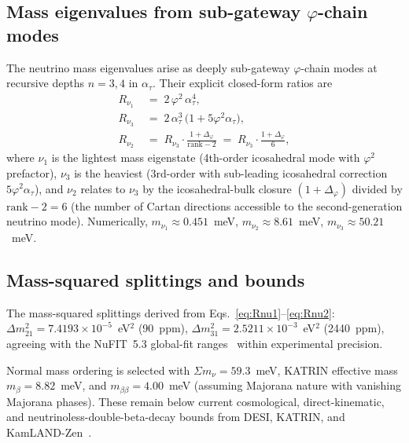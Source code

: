 ﻿\documentclass[reprint,amsmath,amssymb,aps,prd,longbibliography,floatfix]{revtex4-2}
\begin{document}
\subsection{Mass eigenvalues from sub-gateway $\varphi$-chain modes}

The neutrino mass eigenvalues arise as deeply sub-gateway
$\varphi$-chain modes at recursive depths $n = 3, 4$ in $\alpha_\tau$.
Their explicit closed-form ratios are
\begin{align}
R_{\nu_1} \;&=\; 2 \, \varphi^2 \, \alpha_\tau^4,
   \label{eq:Rnu1} \\
R_{\nu_3} \;&=\; 2 \, \alpha_\tau^3 \, \bigl(1 + 5 \varphi^2 \alpha_\tau\bigr),
   \label{eq:Rnu3} \\
R_{\nu_2} \;&=\; R_{\nu_3} \cdot \frac{1 + \Delta_\varphi}{\text{rank} - 2}
            \;=\; R_{\nu_3} \cdot \frac{1 + \Delta_\varphi}{6},
   \label{eq:Rnu2}
\end{align}
where $\nu_1$ is the lightest mass eigenstate (4th-order icosahedral
mode with $\varphi^2$ prefactor), $\nu_3$ is the heaviest (3rd-order
with sub-leading icosahedral correction $5\varphi^2\alpha_\tau$),
and $\nu_2$ relates to $\nu_3$ by the icosahedral-bulk closure
$(1+\Delta_\varphi)$ divided by $\text{rank} - 2 = 6$ (the number of
Cartan directions accessible to the second-generation neutrino mode).
Numerically, $m_{\nu_1} \approx 0.451$~meV, $m_{\nu_2} \approx 8.61$~meV,
$m_{\nu_3} \approx 50.21$~meV.

\subsection{Mass-squared splittings and bounds}

The mass-squared splittings derived from
Eqs.~\eqref{eq:Rnu1}--\eqref{eq:Rnu2}:
$\Delta m^2_{21} = 7.4193 \times 10^{-5}$~eV$^2$ (\SI{90}{ppm}),
$\Delta m^2_{31} = 2.5211 \times 10^{-3}$~eV$^2$ (\SI{2440}{ppm}),
agreeing with the NuFIT~5.3 global-fit ranges~\cite{Esteban2020,NuFIT53}
within experimental precision.

Normal mass ordering is selected with $\Sigma m_\nu = 59.3$~meV,
KATRIN effective mass $m_\beta = 8.82$~meV, and
$m_{\beta\beta} = 4.00$~meV (assuming Majorana nature with vanishing
Majorana phases). These remain below current cosmological,
direct-kinematic, and neutrinoless-double-beta-decay bounds from
DESI, KATRIN, and KamLAND-Zen~\cite{DESI2024,KATRIN2024,KamLANDZen2024}.
\end{document}
